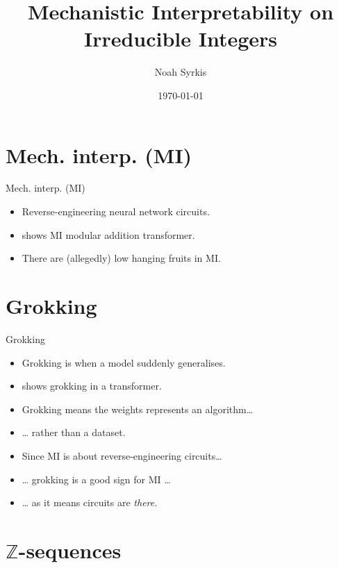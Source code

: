 \documentclass[aspectratio=32]{beamer}
\title{Mechanistic Interpretability on Irreducible Integers}
\date{\mydate\today}
\author{Noah Syrkis}
\providecommand{\tightlist}{\setlength{\itemsep}{0pt}\setlength{\parskip}{0pt}}
\begin{document}
  \begin{frame}[allowframebreaks]
    \titlepage
  \end{frame}

  \section{\textbar{} Mech. interp. (MI)}\label{mech.-interp.-mi}

  \begin{frame}[allowframebreaks]{\textbar{} Mech. interp. (MI)}
  \begin{itemize}
  \tightlist
  \item
    Reverse-engineering neural network circuits.
  \item
    \textcite{nanda2023} shows MI modular addition transformer.
  \item
    There are (allegedly) low hanging fruits in MI.
  \end{itemize}
  \end{frame}

  \section{\textbar{} Grokking}\label{grokking}

  \begin{frame}[allowframebreaks]{\textbar{} Grokking}
  \begin{itemize}
  \tightlist
  \item
    Grokking is when a model suddenly generalises.
  \item
    \textcite{nanda2023} shows grokking in a transformer.
  \item
    Grokking means the weights represents an algorithm\ldots{}
  \item
    \ldots{} rather than a dataset.
  \end{itemize}

  \framebreak

  \begin{itemize}
  \tightlist
  \item
    Since MI is about reverse-engineering circuits\ldots{}
  \item
    \ldots{} grokking is a good sign for MI \ldots{}
  \item
    \ldots{} as it means circuits are \emph{there}.
  \end{itemize}
  \end{frame}

  \section{\texorpdfstring{\textbar{} \(\mathbb{Z}\)-sequences}{\textbar{} \textbackslash mathbb\{Z\}-sequences}}\label{mathbbz-sequences}
\end{document}
